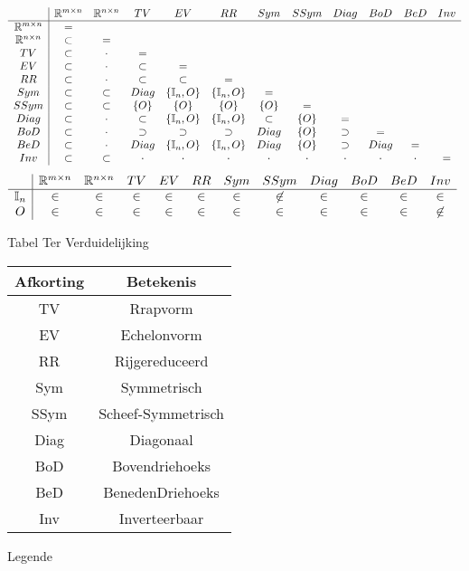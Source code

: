 \documentclass[lineaire_algebra_oplossingen.tex]{subfiles}
\begin{document}
\begin{figure}
\centering
\[
\begin{array}{c | c c c c c c c c c c c}
 & \mathbb{R}^{m\times n} & \mathbb{R}^{n\times n} & TV & EV & RR & Sym & SSym & Diag & BoD & BeD & Inv\\
 \hline
\mathbb{R}^{m\times n} 	& =\\
\mathbb{R}^{n\times n} 	& \subset 	& =\\
TV 						& \subset 	& \cdot 	& =\\
EV 						& \subset 	& \cdot 	& \subset 	& =\\
RR 						& \subset 	& \cdot 	& \subset 	& \subset 			& =\\ 
Sym 					& \subset	& \subset	& Diag		& \{\mathbb{I}_n,O\}& \{\mathbb{I}_n,O\}& =\\
SSym 					& \subset	& \subset	& \{O\}		& \{O\}				& \{O\} 			& \{O\}	& =\\
Diag 					& \subset	& \cdot		& \subset	& \{\mathbb{I}_n,O\}& \{\mathbb{I}_n,O\}& \subset	& \{O\}	& =\\
BoD 					& \subset	& \cdot		& \supset	& \supset 			& \supset			& Diag				& \{O\}	& \supset	& =\\
BeD 					& \subset	& \cdot		& Diag		& \{\mathbb{I}_n,O\}& \{\mathbb{I}_n,O\}& Diag				& \{O\} & \supset	& Diag	& =\\
Inv						& \subset	& \subset	& \cdot		& \cdot 			& \cdot 			& \cdot	& \cdot 		& \cdot	& \cdot		& \cdot 	& =\\
\end{array}
\]
\[
\begin{array}{c | c c c c c c c c c c c}
 & \mathbb{R}^{m\times n} & \mathbb{R}^{n\times n} & TV & EV & RR & Sym & SSym & Diag & BoD & BeD & Inv\\
\hline
\mathbb{I}_n 			& \in & \in & \in & \in & \in & \in & \not\in 	& \in & \in & \in & \in \\
O 						& \in & \in & \in & \in & \in & \in & \in 		& \in & \in & \in & \not\in\\
\end{array}
\]
\label{tabel}
\caption{Tabel Ter Verduidelijking}
\end{figure}


\begin{figure}[H]
\centering
\begin{tabular}{| c | c |}
\hline
Afkorting & Betekenis\\
\hline
TV & Rrapvorm\\
EV & Echelonvorm\\
RR & Rijgereduceerd\\
Sym & Symmetrisch\\
SSym & Scheef-Symmetrisch\\
Diag & Diagonaal\\
BoD & Bovendriehoeks\\
BeD & BenedenDriehoeks\\
Inv & Inverteerbaar\\
\hline
\end{tabular}
\label{legende}
\caption{Legende}
\end{figure}
\end{document}
